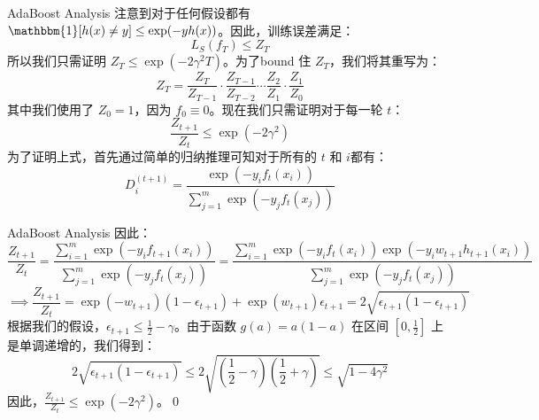 \begin{frame}{AdaBoost Analysis}
    注意到对于任何假设都有 $ \mathbbm{1}[h(x) \neq y] \leq \exp(-y h(x))$。因此，训练误差满足：
    \[
    L_S(f_T) \leq Z_T
    \]
    所以我们只需证明 $Z_T \leq \exp(-2 \gamma^2 T)$。为了bound 住 $Z_T$，我们将其重写为：
    \[
    Z_T =  \frac{Z_T}{Z_{T-1}} \cdot \frac{Z_{T-1}}{Z_{T-2}}  \cdots \frac{Z_2}{Z_1} \cdot \frac{Z_1}{Z_0}
    \]
    其中我们使用了 $Z_0 = 1$，因为 $f_0 \equiv 0$。现在我们只需证明对于每一轮 $t$：
    \[
    \frac{Z_{t+1}}{Z_t} \leq \exp(-2 \gamma^2)
    \]
    为了证明上式，首先通过简单的归纳推理可知对于所有的 $t$ 和 $i$都有：
    \[
    D_{i}^{(t+1)} = \frac{\exp(-y_i f_t(x_i))}{\sum_{j=1}^{m} \exp(-y_j f_t(x_j))}
    \]
\end{frame}

\begin{frame}{AdaBoost Analysis}
    因此：
    \[
    \frac{Z_{t+1}}{Z_t} = \frac{\sum_{i=1}^{m} \exp(-y_i f_{t+1}(x_i))}{\sum_{j=1}^{m} \exp(-y_j f_t(x_j))} = \frac{\sum_{i=1}^{m} \exp(-y_i f_t(x_i)) \exp(-y_i w_{t+1} h_{t+1}(x_i))}{\sum_{j=1}^{m} \exp(-y_j f_t(x_j))}
    \]
    \[
    \implies \frac{Z_{t+1}}{Z_t} = \exp(-w_{t+1}) \left(1 - \epsilon_{t+1}\right) + \exp(w_{t+1}) \epsilon_{t+1} = 2 \sqrt{\epsilon_{t+1}(1 - \epsilon_{t+1})}
    \]
    根据我们的假设，$\epsilon_{t+1} \leq \frac{1}{2} - \gamma$。由于函数 $g(a) = a(1 - a)$ 在区间 $[0, \frac{1}{2}]$ 上是单调递增的，我们得到：
    \[
    2 \sqrt{\epsilon_{t+1}(1 - \epsilon_{t+1})} \leqslant 2 \sqrt{\left(\frac{1}{2} - \gamma\right) \left(\frac{1}{2} + \gamma\right)} \leqslant \sqrt{1 - 4 \gamma^2} 
    \]
    因此，$\frac{Z_{t+1}}{Z_t} \leq \exp(-2 \gamma^2)$。\qed
\end{frame}